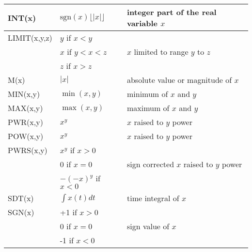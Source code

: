 {\begin{longtable}{>{\raggedright\small}m{1in}>{\raggedright\small}m{2in}>{\raggedright\let\\\tabularnewline\small}m{2in}}
    INT(x) & $\mathrm{sgn}(x)\lfloor |x|\rfloor$ & integer part of the real 
    variable $x$  \\ \hline

    LIMIT(x,y,z)
    & $y$ if $x < y$ & \\
    & $x$ if $y < x < z$  & $x$ limited to range $y$ to $z$ \\
    & $z$ if $x > z$ & \\ \hline
    
    
    M(x) & $|x|$ & absolute value or magnitude of $x$ \\ \hline

    MIN(x,y) & $\min(x,y)$ & minimum of $x$ and $y$  \\ \hline

    MAX(x,y) & $\max(x,y)$ & maximum of $x$ and $y$  \\ \hline


    PWR(x,y) & $x^{y}$ & $x$ raised to $y$ power  \\ \hline
    POW(x,y) & $x^{y}$ & $x$ raised to $y$ power  \\ \hline
    PWRS(x,y)
    & $x^{y}$ if $x > 0$ & \\
    & 0 if $x = 0$ & sign corrected $x$ raised to $y$ power  \\
    & $-(-x)^{y}$ if $x < 0$ & \\ \hline

    SDT(x)
    & $\int x(t)  dt$ & time integral of $x$ \\ \hline
    
    SGN(x)
    & +1 if $x > 0$ & \\
    & 0 if $x = 0$  & sign value of $x$\\
    & -1 if $x < 0$ & \\ \hline


\end{longtable}}
